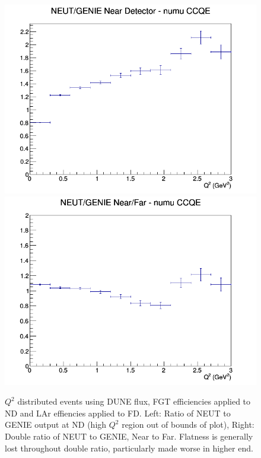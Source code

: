 \documentclass[12pt]{article}
\begin{document}
\begin{figure}[h]
\includegraphics[width=\linewidth]{eff_Q2/FGT/ratios/CCQE_NEUT_GENIE_numu_near_Q2.png}
\endminipage
{}
\includegraphics[width=\linewidth]{eff_Q2/FGT/ratios/CCQE_NEUT_GENIE_numu_NF_Q2.png}
\endminipage
\caption{$Q^2$ distributed events using DUNE flux, FGT efficiencies applied to ND and LAr effiencies applied to FD. Left: Ratio of NEUT to GENIE output at ND (high $Q^2$ region out of bounds of plot), Right: Double ratio of NEUT to GENIE, Near to Far. Flatness is generally lost throughout double ratio, particularly made worse in higher end.}
\end{figure}
\FloatBarrier
\end{document}

